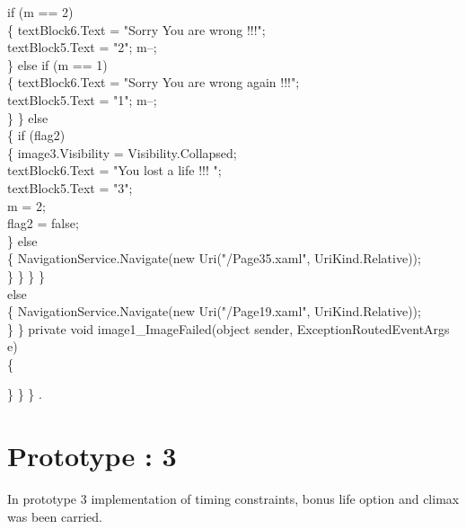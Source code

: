{{                        if (m == 2)\\
                        \{
                            textBlock6.Text = "Sorry You are wrong !!!";\\
                            textBlock5.Text = "2"; m--;\\
                        \}
                        else if (m == 1)\\
                        \{
                            textBlock6.Text = "Sorry You are wrong again !!!";\\
                            textBlock5.Text = "1"; m--;\\
                        \}
                    \}
                    else\\
                    \{
                        if (flag2)\\
                        \{
                            image3.Visibility = Visibility.Collapsed;\\
                            textBlock6.Text = "You lost a life !!! ";\\
                            textBlock5.Text = "3";\\
                            m = 2;\\
                            flag2 = false;\\
                        \}
                        else\\
                        \{
                            NavigationService.Navigate(new Uri("/Page35.xaml", UriKind.Relative));\\
                        \}
                    \}
                \}
            \}\\

            else\\
            \{
                NavigationService.Navigate(new Uri("/Page19.xaml", UriKind.Relative));\\
            \}
        \}
        private void image1_ImageFailed(object sender, ExceptionRoutedEventArgs e)\\
        \{

        \}
    \}
\}
\cite{DBLP:journals/ivc/KadyrovP03}.\\
\rmfamily




\section{Prototype : 3}
\hspace{1cm}In prototype 3 implementation of timing constraints, bonus life option and climax was been carried.
}}
